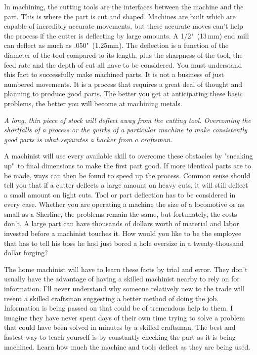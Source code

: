 \secdown

\secdown


In machining, the cutting tools are the interfaces between the machine and the
part. This is where the part is cut and shaped. Machines are built which are
capable of incredibly accurate movements, but these accurate moves can't help
the process if the cutter is deflecting by large amounts. A 1/2"\ (13\,mm) end
mill can deflect as much as .050"\ (1.25mm). The deflection is a function of the
diameter of the tool compared to its length, plus the sharpness of the tool, the
feed rate and the depth of cut all have to be considered. You must understand
this fact to successfully make machined parts. It is not a business of just
numbered movements. It is a process that requires a great deal of thought and
planning to produce good parts. The better you get at anticipating these basic
problems, the better you will become at machining metals.

\bigskip
\textit{A long, thin piece of stock will deflect away from the cutting tool.
Overcoming the shortfalls of a process or the quirks of a particular machine to
make consistently good parts is what separates a hacker from a craftsman.}
\bigskip

A machinist will use every available skill to overcome these obstacles by
"sneaking up"\ to final dimensions to make the first part good. If more identical
parts are to be made, ways can then be found to speed up the process. Common
sense should tell you that if a cutter deflects a large amount on heavy cuts, it
will still deflect a small amount on light cuts. Tool or part deflection has to
be considered in every case. Whether you are operating a machine the size of a
locomotive or as small as a Sherline, the problems remain the same, but
fortunately, the costs don't. A large part can have thousands of dollars worth
of material and labor invested before a machinist touches it. How would you like
to be the employee that has to tell his boss he had just bored a hole oversize
in a twenty-thousand dollar forging?

The home machinist will have to learn these facts by trial and error. They don't
usually have the advantage of having a skilled machinist nearby to rely on for
information. I'll never understand why someone relatively new to the trade will
resent a skilled craftsman suggesting a better method of doing the job.
Information is being passed on that could be of tremendous help to them. I
imagine they have never spent days of their own time trying to solve a problem
that could have been solved in minutes by a skilled craftsman. The best and
fastest way to teach yourself is by constantly checking the part as it is being
machined. Learn how much the machine and tools deflect as they are being used.

